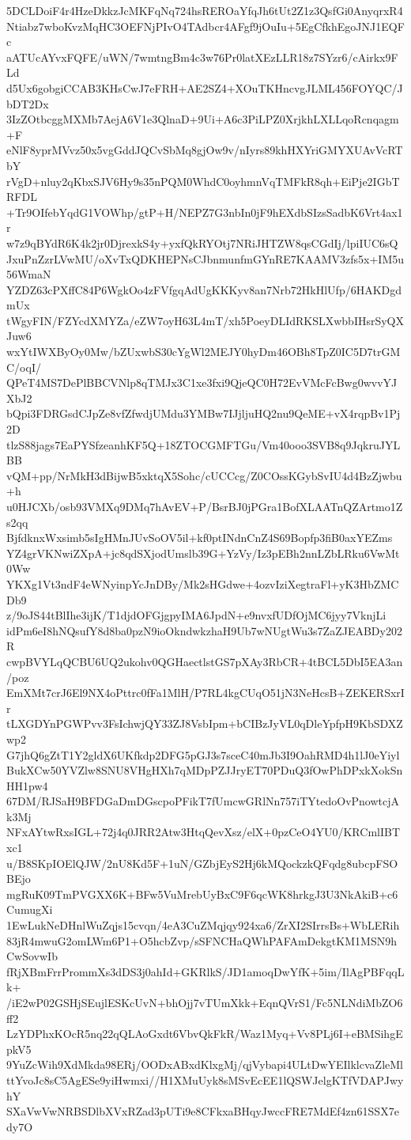 5DCLDoiF4r4HzeDkkzJcMKFqNq724hsREROaYfqJh6tUt2Z1z3QsfGi0AnyqrxR4
Ntiabz7wboKvzMqHC3OEFNjPIvO4TAdbcr4AFgf9jOuIu+5EgCfkhEgoJNJ1EQFc
aATUcAYvxFQFE/uWN/7wmtngBm4c3w76Pr0latXEzLLR18z7SYzr6/cAirkx9FLd
d5Ux6gobgiCCAB3KHsCwJ7eFRH+AE2SZ4+XOuTKHncvgJLML456FOYQC/JbDT2Dx
3IzZOtbcggMXMb7AejA6V1e3QlnaD+9Ui+A6c3PiLPZ0XrjkhLXLLqoRcnqagm+F
eNlF8yprMVvz50x5vgGddJQCvSbMq8gjOw9v/nIyrs89khHXYriGMYXUAvVcRTbY
rVgD+nluy2qKbxSJV6Hy9s35nPQM0WhdC0oyhmnVqTMFkR8qh+EiPje2IGbTRFDL
+Tr9OIfebYqdG1VOWhp/gtP+H/NEPZ7G3nbIn0jF9hEXdbSIzsSadbK6Vrt4ax1r
w7z9qBYdR6K4k2jr0DjrexkS4y+yxfQkRYOtj7NRiJHTZW8qsCGdIj/lpiIUC6sQ
JxuPnZzrLVwMU/oXvTxQDKHEPNsCJbnmunfmGYnRE7KAAMV3zfs5x+IM5u56WmaN
YZDZ63cPXffC84P6WgkOo4zFVfgqAdUgKKKyv8an7Nrb72HkHlUfp/6HAKDgdmUx
tWgyFIN/FZYcdXMYZa/eZW7oyH63L4mT/xh5PoeyDLIdRKSLXwbbIHsrSyQXJuw6
wxYtIWXByOy0Mw/bZUxwbS30cYgWl2MEJY0hyDm46OBh8TpZ0IC5D7trGMC/oqI/
QPeT4MS7DePlBBCVNlp8qTMJx3C1xe3fxi9QjeQC0H72EvVMcFcBwg0wvvYJXbJ2
bQpi3FDRGsdCJpZe8vfZfwdjUMdu3YMBw7IJjljuHQ2nu9QeME+vX4rqpBv1Pj2D
tlzS88jags7EaPYSfzeanhKF5Q+18ZTOCGMFTGu/Vm40ooo3SVB8q9JqkruJYLBB
vQM+pp/NrMkH3dBijwB5xktqX5Sohc/cUCCcg/Z0COssKGybSvIU4d4BzZjwbu+h
u0HJCXb/osb93VMXq9DMq7hAvEV+P/BsrBJ0jPGra1BofXLAATnQZArtmo1Zs2qq
BjfdknxWxsimb5sIgHMnJUvSoOV5il+kf0ptINdnCnZ4S69Bopfp3fiB0axYEZms
YZ4grVKNwiZXpA+jc8qdSXjodUmslb39G+YzVy/Iz3pEBh2nnLZbLRku6VwMt0Ww
YKXg1Vt3ndF4eWNyinpYcJnDBy/Mk2sHGdwe+4ozvIziXegtraFl+yK3HbZMCDb9
z/9oJS44tBlIhe3ijK/T1djdOFGjgpyIMA6JpdN+e9nvxfUDfOjMC6jyy7VknjLi
idPm6eI8hNQsufY8d8ba0pzN9ioOkndwkzhaH9Ub7wNUgtWu3s7ZaZJEABDy202R
cwpBVYLqQCBU6UQ2ukohv0QGHaectlstGS7pXAy3RbCR+4tBCL5DbI5EA3an/poz
EmXMt7crJ6El9NX4oPttrc0fFa1MlH/P7RL4kgCUqO51jN3NeHcsB+ZEKERSxrIr
tLXGDYnPGWPvv3FsIchwjQY33ZJ8VsbIpm+bCIBzJyVL0qDleYpfpH9KbSDXZwp2
G7jhQ6gZtT1Y2gldX6UKfkdp2DFG5pGJ3s7sceC40mJb3I9OahRMD4h1lJ0eYiyl
BukXCw50YVZlw8SNU8VHgHXh7qMDpPZJJryET70PDuQ3fOwPhDPxkXokSnHH1pw4
67DM/RJSaH9BFDGaDmDGscpoPFikT7fUmcwGRlNn757iTYtedoOvPnowtcjAk3Mj
NFxAYtwRxsIGL+72j4q0JRR2Atw3HtqQevXsz/elX+0pzCeO4YU0/KRCmlIBTxc1
u/B8SKpIOElQJW/2nU8Kd5F+1uN/GZbjEyS2Hj6kMQockzkQFqdg8ubcpFSOBEjo
mgRuK09TmPVGXX6K+BFw5VuMrebUyBxC9F6qcWK8hrkgJ3U3NkAkiB+c6CumugXi
1EwLukNeDHnlWuZqjs15cvqn/4eA3CuZMqjqy924xa6/ZrXI2SIrrsBs+WbLERih
83jR4mwuG2omLWm6P1+O5hcbZvp/sSFNCHaQWhPAFAmDekgtKM1MSN9hCwSovwIb
fRjXBmFrrPrommXs3dDS3j0ahId+GKRlkS/JD1amoqDwYfK+5im/IlAgPBFqqLk+
/iE2wP02GSHjSEujlESKcUvN+bhOjj7vTUmXkk+EqnQVrS1/Fc5NLNdiMbZO6ff2
LzYDPhxKOcR5nq22qQLAoGxdt6VbvQkFkR/Waz1Myq+Vv8PLj6I+eBMSihgEpkV5
9YuZcWih9XdMkda98ERj/OODxABxdKlxgMj/qjVybapi4ULtDwYEIlklcvaZleMl
ttYvoJc8sC5AgESe9yiHwmxi//H1XMuUyk8sMSvEcEE1lQSWJelgKTfVDAPJwyhY
SXaVwVwNRBSDlbXVxRZad3pUTi9e8CFkxaBHqyJwccFRE7MdEf4zn61SSX7edy7O
